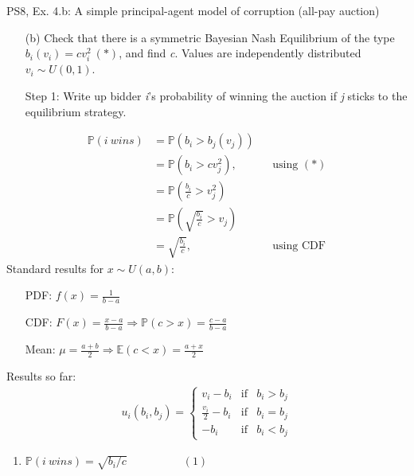 \begin{frame}{PS8, Ex. 4.b: A simple principal-agent model of corruption (all-pay auction)}
    \begin{itemize}
      \item[(b)] Check that there is a symmetric Bayesian Nash Equilibrium of the type $b_i(v_i) = cv_i^2\ (*)$, and find \textit{c}. Values are independently distributed $v_i\sim U(0, 1)$.
    \end{itemize} \vspace{-8pt}
    \begin{multicols}{2}
      \begin{itemize}
        \item[Step 1:] Write up bidder \textit{i}'s probability of winning the auction if \textit{j} sticks to the equilibrium strategy.
      \end{itemize} \vspace{-8pt}
      \begin{align*}
        \mathbb{P}(i\ wins)&=\mathbb{P}(b_i>b_j(v_j))\\
                           &=\mathbb{P}(b_i>cv_j^2),&&\text{using }(*)\\
                           &=\mathbb{P}\left(\frac{b_i}{c}>v_j^2\right)\\
                           &=\mathbb{P}\left(\sqrt{\frac{b_i}{c}}>v_j\right)\\
                           &=\sqrt{\frac{b_i}{c}},&&\text{using CDF}
      \end{align*}
      \vfill\null\columnbreak
      Standard results for $x\sim U(a, b):$ \vspace{-6pt}
      \begin{itemize}
        \item[PDF:] $f(x)=\frac{1}{b-a}$
        \item[CDF:] $F(x)=\frac{x-a}{b-a}\Rightarrow\mathbb{P}(c>x)=\frac{c-a}{b-a}$
        \item[Mean:] $\mu=\frac{a+b}{2}\Rightarrow\mathbb{E}(c<x)=\frac{a+x}{2}$
      \end{itemize}
      \vspace{-6pt}
      Results so far: \vspace{-6pt}
      \begin{align*}
        u_i(b_i,b_j)=\left\{\begin{array}{lcl}
          v_i-b_i           & \text{if} & b_i>b_j \\
          \frac{v_i}{2}-b_i & \text{if} & b_i=b_j \\
          -b_i              & \text{if} & b_i<b_j
        \end{array}\right.
      \end{align*} \vspace{-16pt}
      \begin{enumerate}
        \item $\mathbb{P}(i\ wins)=\sqrt{b_i/c}\quad\quad\quad\quad\quad(1)$
      \end{enumerate}
      \vfill\null
    \end{multicols}
\end{frame}
